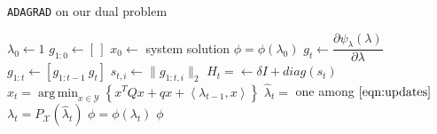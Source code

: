 \documentclass[notitlepage]{article}
\DeclareMathOperator*{\argmin}{arg\,min}
\begin{document}
\begin{algorithm}[H]
  \caption{\texttt{ADAGRAD} on our dual problem}
  \label{alg:my_alg}
  \begin{algorithmic}
      \State $\lambda_0 \gets 1$
      \State $g_{1:0} \gets \left[\,\right]$
      \State $x_0 \gets$ system solution  
      \State $\phi = \phi(\lambda_0)$
        \State $g_t \gets \dfrac{\partial \psi_\lambda(\lambda)}{\partial \lambda}$
        \State $g_{1:t} \gets \left[ g_{1:t-1}\ g_t \right]$
        \State $s_{t,i} \gets \| g_{1:t,i} \|_2$
        \State $H_t = \gets \delta \mathit{I} + diag(s_t)$
        \State $x_t = \argmin_{x \in \mathcal{Y}} \left\lbrace x^T Q x + q x + \left\langle \lambda_{t-1},x \right\rangle \right\rbrace$
        \State $\hat{\lambda}_t =$ one among $\eqref{eqn:updates}$
        \State $\lambda_t = P_\mathcal{X}(\hat{\lambda}_t)$ 
          \State $\phi = \phi(\lambda_t)$
        \EndIf
          \State \Return $\phi$ 
        \EndIf
      \EndFor
    \EndFunction
  \end{algorithmic}  
\end{algorithm}
\end{document}
